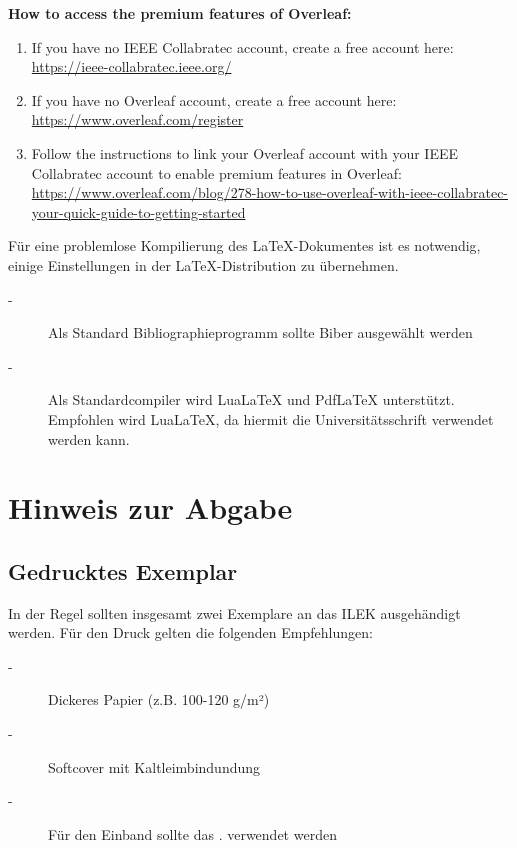 \begin{tcolorbox}[width=\linewidth, sharp corners=all, colback=white!95!black]
\textbf{How to access the premium features of Overleaf:}
\begin{enumerate}
    \item If you have no IEEE Collabratec account, create a free account here: \url{https://ieee-collabratec.ieee.org/}
    \item If you have no Overleaf account, create a free account here: \url{https://www.overleaf.com/register}
    \item Follow the instructions to link your Overleaf account with your IEEE Collabratec account to enable premium features in Overleaf: \url{https://www.overleaf.com/blog/278-how-to-use-overleaf-with-ieee-collabratec-your-quick-guide-to-getting-started}
\end{enumerate}
\end{tcolorbox}

\doublespacing
Für eine problemlose Kompilierung des \LaTeX-Dokumentes ist es notwendig, einige Einstellungen in der LaTeX-Distribution zu übernehmen.

\begin{description}
	\item[-] Als Standard Bibliographieprogramm sollte Biber ausgewählt werden
	\item[-] Als Standardcompiler wird LuaLaTeX und PdfLaTeX unterstützt. Empfohlen wird LuaLaTeX, da hiermit die Universitätsschrift verwendet werden kann.
\end{description}


\section*{Hinweis zur Abgabe}

\subsection*{Gedrucktes Exemplar}

In der Regel sollten insgesamt zwei Exemplare an das ILEK ausgehändigt werden. Für den Druck gelten die folgenden Empfehlungen:

\begin{description}
	\item[-] Dickeres Papier (z.B. 100-120 g/m²)
	\item[-] Softcover mit Kaltleimbindundung
	\item[-] Für den Einband sollte das . verwendet werden 
\end{description}

